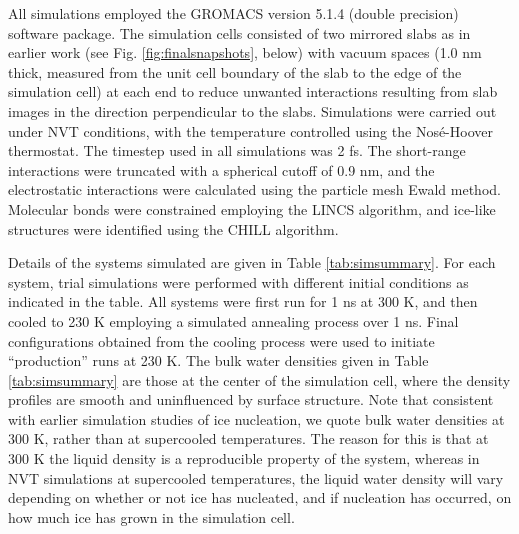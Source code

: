 \documentclass[preprint,aps,prb,floatfix]{revtex4-1}
\begin{document}
All simulations employed the GROMACS version 5.1.4 (double precision) software package.\cite{AMSS15} The simulation cells consisted of two mirrored slabs as in earlier work\cite{ZBP15a,ZBP15b} (see Fig. \ref{fig:finalsnapshots}, below) with vacuum spaces (1.0 nm thick, measured from the unit cell boundary of the slab to the edge of the simulation cell) at each end to reduce unwanted interactions resulting from slab images in the direction perpendicular to the slabs. Simulations were carried out under NVT conditions, with the temperature controlled using the Nos\'{e}-Hoover thermostat.\cite{N84,H85} The timestep used in all simulations was 2 fs. The short-range interactions were truncated with a spherical cutoff of 0.9 nm, and the electrostatic interactions were calculated using the particle mesh Ewald method.\cite{DYP93,EPBD95} Molecular bonds were constrained employing the LINCS algorithm,\cite{HBBF97} and ice-like structures were identified using the CHILL algorithm.\cite{MLWSM10}

Details of the systems simulated are given in Table \ref{tab:simsummary}. For each system, trial simulations were performed with different initial conditions as indicated in the table. All systems were first run for 1 ns at 300 K, and then cooled to 230 K employing a simulated annealing process over 1 ns. Final configurations obtained from the cooling process were used to initiate ``production'' runs at 230 K. The bulk water densities given in Table \ref{tab:simsummary} are those at  the center of the simulation cell, where the density profiles are smooth and uninfluenced by surface structure. Note that consistent with earlier simulation studies of ice nucleation,\cite{ZBP15a,ZBP15b} we quote bulk water densities at 300 K, rather than at supercooled temperatures. The reason for this is that at 300 K the liquid density is a reproducible property of the system, whereas in NVT simulations at supercooled temperatures, the liquid water density will vary depending on whether or not ice has nucleated, and if nucleation has occurred, on how much ice has grown in the simulation cell.
\end{document}
